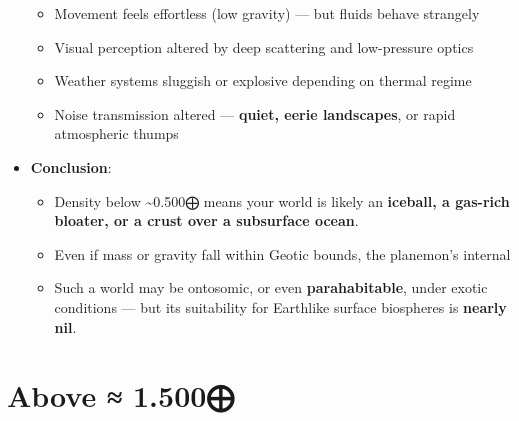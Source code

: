 \documentclass[
  letterpaper,
]{book}
\providecommand{\tightlist}{%
  \setlength{\itemsep}{0pt}\setlength{\parskip}{0pt}}
\begin{document}
\begin{itemize}
  \begin{itemize}
  \tightlist
  \item
    Movement feels effortless (low gravity) --- but fluids behave
    strangely
  \item
    Visual perception altered by deep scattering and low-pressure optics
  \item
    Weather systems sluggish or explosive depending on thermal regime
  \item
    Noise transmission altered --- \textbf{quiet, eerie landscapes}, or
    rapid atmospheric thumps
  \end{itemize}
\item
  \textbf{Conclusion}:

  \begin{itemize}
  \tightlist
  \item
    Density below \textasciitilde0.500⨁ means your world is likely an
    \textbf{iceball, a gas-rich bloater, or a crust over a subsurface
    ocean}.
  \item
    Even if mass or gravity fall within Geotic bounds, the planemon's
    internal
  \item
    Such a world may be ontosomic, or even \textbf{parahabitable}, under
    exotic conditions --- but its suitability for Earthlike surface
    biospheres is \textbf{nearly nil}.
  \end{itemize}
\end{itemize}

\section{Above ≈ 1.500⨁}\label{above-1.500}
\end{document}
